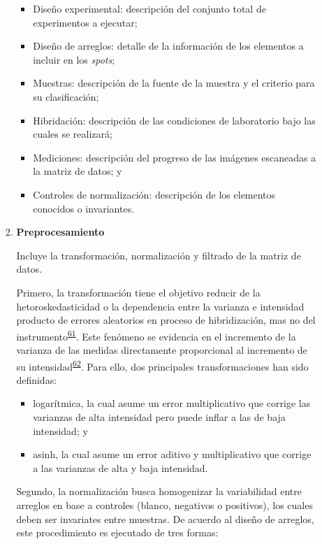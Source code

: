 \documentclass[]{article}
\providecommand{\tightlist}{%
  \setlength{\itemsep}{0pt}\setlength{\parskip}{0pt}}
\begin{document}
\begin{enumerate}
\begin{enumerate}
\begin{enumerate}
      \begin{itemize}
      \tightlist
      \item
        Diseño experimental: descripción del conjunto total de
        experimentos a ejecutar;
      \item
        Diseño de arreglos: detalle de la información de los elementos a
        incluir en los \emph{spots};
      \item
        Muestras: descripción de la fuente de la muestra y el criterio
        para su clasificación;
      \item
        Hibridación: descripción de las condiciones de laboratorio bajo
        las cuales se realizará;
      \item
        Mediciones: descripción del progreso de las imágenes escaneadas
        a la matriz de datos; y
      \item
        Controles de normalización: descripción de los elementos
        conocidos o invariantes.
      \end{itemize}
    \item
      \textbf{Preprocesamiento}

      Incluye la transformación, normalización y filtrado de la matriz
      de datos.

      Primero, la transformación tiene el objetivo reducir de la
      hetoroskedasticidad o la dependencia entre la varianza e
      intensidad producto de errores aleatorios en proceso de
      hibridización, mas no del
      instrumento\textsuperscript{\protect\hyperlink{ref-kreil2005bullet}{61}}.
      Este fenómeno se evidencia en el incremento de la varianza de las
      medidas directamente proporcional al incremento de su
      intensidad\textsuperscript{\protect\hyperlink{ref-brown2001image}{62}}.
      Para ello, dos principales transformaciones han sido definidas:

      \begin{itemize}
      \tightlist
      \item
        logarítmica, la cual asume un error multiplicativo que corrige
        las varianzas de alta intensidad pero puede inflar a las de baja
        intensidad; y
      \item
        asinh, la cual asume un error aditivo y multiplicativo que
        corrige a las varianzas de alta y baja intensidad.
      \end{itemize}

      Segundo, la normalización busca homogenizar la variabilidad entre
      arreglos en base a controles (blanco, negativos o positivos), los
      cuales deben ser invariates entre muestras. De acuerdo al diseño
      de arreglos, este procedimiento es ejecutado de tres formas:


\end{enumerate}
\end{enumerate}
\end{enumerate}
\end{document}
